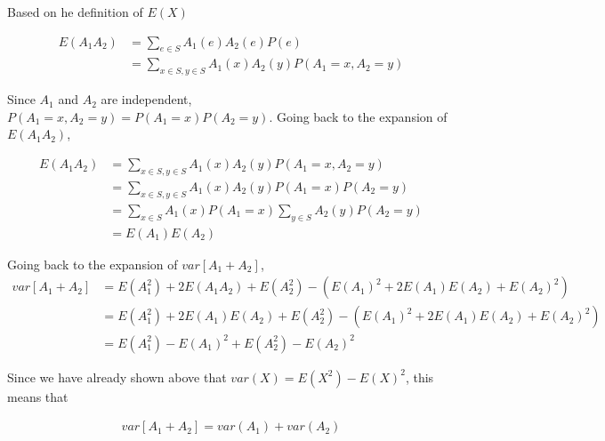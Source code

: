\begin{enumerate}
Based on he definition of $E(X)$

 \begin{equation*}
\begin{aligned}
E(A_1A_2) &= \sum_{e \in S} A_1(e) A_2(e) P(e) \\
&= \sum_{x \in S, y \in S} A_1(x) A_2(y) P(A_1=x, A_2=y) 
\end{aligned}
\end{equation*} 

Since $A_1$ and $A_2$ are independent, $P(A_1=x, A_2=y) = P(A_1=x)P(A_2=y)$. Going back to the expansion of $E(A_1A_2)$,

 \begin{equation*}
\begin{aligned}
E(A_1A_2) &=  \sum_{x \in S, y \in S} A_1(x) A_2(y) P(A_1=x, A_2=y)\\
&= \sum_{x \in S, y \in S} A_1(x) A_2(y) P(A_1=x) P(A_2=y)\\
&= \sum_{x \in S} A_1(x) P(A_1=x) \sum_{y \in S} A_2(y) P(A_2=y)\\
&= E(A_1) E(A_2)
\end{aligned}
\end{equation*} 


Going back to the expansion of $var[A_1 + A_2]$,
\begin{equation*}
\begin{aligned}
var [A_1 + A_2] &= E(A_1^2) + 2E(A_1A_2) + E(A_2^2) - (E(A_1)^2 + 2E(A_1)E(A_2) + E(A_2)^2)\\
&= E(A_1^2) + 2E(A_1) E(A_2) + E(A_2^2) - (E(A_1)^2 + 2E(A_1)E(A_2) + E(A_2)^2)\\
&= E(A_1^2) - E(A_1)^2 + E(A_2^2) - E(A_2)^2
\end{aligned}
\end{equation*} 

Since we have already shown above that $var(X)=E(X^2) - E(X)^2$, this means that 

\begin{equation*}
\begin{aligned}
var [A_1 + A_2] = var(A_1) + var(A_2)
\end{aligned}
\end{equation*} 

  \end{enumerate}

